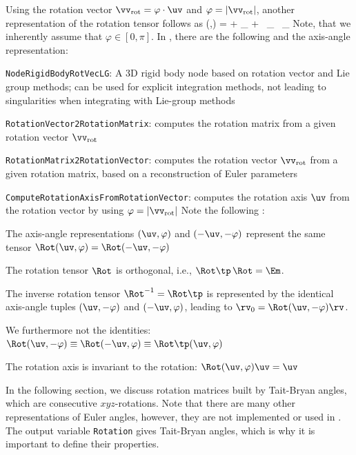 %
Using the rotation vector $\vv_\mathrm{rot} = \varphi\cdot \uv$ and $\varphi = |\vv_\mathrm{rot}|$, another representation of the rotation tensor follows as
\be 
  \Rot(\uv ,\varphi) =  \Im + \frac{\sin \varphi}{\varphi} \tilde\vv_ +  \,  \tilde\vv_ \, \tilde\vv_
\ee
Note, that we inherently assume that $\varphi \in [0,\pi]$.
%
\noindent In \codeName, there are the following  and the axis-angle representation:
\bi
  \item \texttt{NodeRigidBodyRotVecLG}: A 3D rigid body node based on rotation vector and Lie group methods; can be used for explicit integration methods, not leading to singularities when integrating with Lie-group methods
  \item \texttt{RotationVector2RotationMatrix}: computes the rotation matrix from a given rotation vector $\vv_\mathrm{rot}$
  \item \texttt{RotationMatrix2RotationVector}: computes the rotation vector $\vv_\mathrm{rot}$ from a given rotation matrix, based on a reconstruction of Euler parameters
  \item \texttt{ComputeRotationAxisFromRotationVector}: computes the rotation axis $\uv$ from the rotation vector by using $\varphi = |\vv_\mathrm{rot}|$
\ei
%
Note the following :
\bi
  \item The axis-angle representations $(\uv, \varphi)$ and $(-\uv, -\varphi)$ represent the same tensor $\Rot(\uv,\varphi)=\Rot(-\uv,-\varphi)$
  \item The rotation tensor $\Rot$ is orthogonal, i.e., $\Rot\tp \, \Rot = \Em$. 
  \item The inverse rotation tensor $\Rot^{-1} = \Rot\tp$ is represented by the identical axis-angle tuples $(\uv, -\varphi)$ and $(-\uv, \varphi)$, leading to $\rv_0=\Rot(\uv, -\varphi) \rv$.
  \item We furthermore not the identities: $\Rot(\uv, -\varphi) \equiv \Rot(-\uv, \varphi) \equiv \Rot\tp (\uv, \varphi)$
  \item The rotation axis is invariant to the rotation: $\Rot(\uv, \varphi) \uv = \uv$
\ei


In the following section, we discuss rotation matrices built by Tait-Bryan angles, which are consecutive $xyz$-rotations.
Note that there are many other representations of Euler angles, however, they are not implemented or used in \codeName.
The output variable \texttt{Rotation} gives Tait-Bryan angles, which is why it is important to define their properties.

